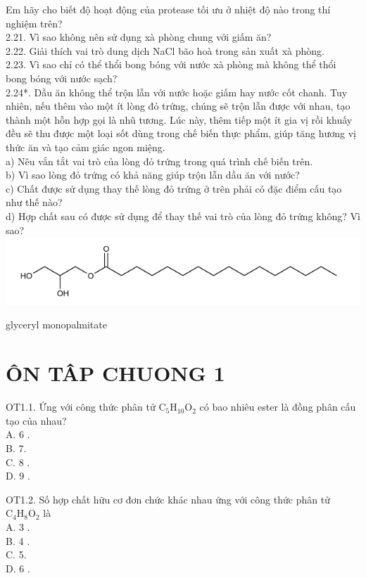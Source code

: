 \documentclass[10pt]{article}
\begin{document}
Em hãy cho biết độ hoạt động của protease tối ưu ở nhiệt độ nào trong thí nghiệm trên?\\
2.21. Vì sao không nên sử dụng xà phòng chung với giấm ăn?\\
2.22. Giải thích vai trò dung dịch NaCl bão hoà trong sản xuất xà phòng.\\
2.23. Vì sao chỉ có thể thổi bong bóng với nước xà phòng mà không thể thổi bong bóng với nước sạch?\\
2.24*. Dầu ăn không thể trộn lẫn với nước hoặc giấm hay nước cốt chanh. Tuy nhiên, nếu thêm vào một ít lòng đỏ trứng, chúng sẽ trộn lẫn được với nhau, tạo thành một hỗn hợp gọi là nhũ tương. Lúc này, thêm tiếp một ít gia vị rồi khuấy đều sẽ thu được một loại sốt dùng trong chế biến thực phẩm, giúp tăng hương vị thức ăn và tạo cảm giác ngon miệng.\\
a) Nêu vắn tắt vai trò của lòng đỏ trứng trong quá trình chế biến trên.\\
b) Vì sao lòng đỏ trứng có khả năng giúp trộn lẫn dầu ăn với nước?\\
c) Chất được sử dụng thay thế lòng đỏ trứng ở trên phải có đặc điểm cấu tạo như thế nào?\\
d) Hợp chất sau có được sử dụng để thay thế vai trò của lòng đỏ trứng không? Vì sao?\\
\includegraphics{smile-3e77c415b93edf8952b3a6828d20f7943c672fc5}

glyceryl monopalmitate

\section*{ÔN TÂP CHUONG 1}
OT1.1. Ứng với công thức phân tử $\mathrm{C}_{5} \mathrm{H}_{10} \mathrm{O}_{2}$ có bao nhiêu ester là đồng phân cấu tạo của nhau?\\
A. 6 .\\
B. 7.\\
C. 8 .\\
D. 9 .

OT1.2. Số hợp chất hữu cơ đơn chức khác nhau ứng với công thức phân tử $\mathrm{C}_{4} \mathrm{H}_{8} \mathrm{O}_{2}$ là\\
A. 3 .\\
B. 4 .\\
C. 5.\\
D. 6 .
\end{document}
